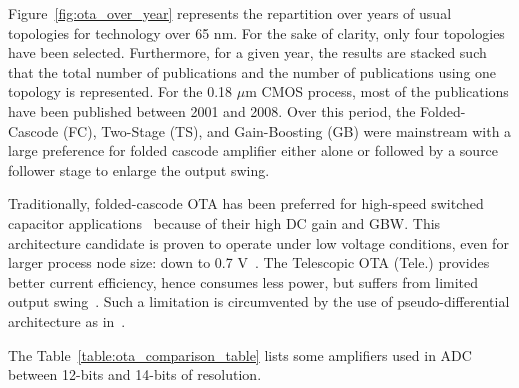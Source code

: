 Figure~\ref{fig:ota_over_year} represents the repartition over years of usual topologies for technology over 65 nm. For the sake of clarity, only four topologies have been selected. Furthermore, for a given year, the results are stacked such that the total number of publications and the number of publications using one topology is represented.
For the 0.18 \(\mu \)m CMOS process, most of the publications have been published between 2001 and 2008. Over this period, the Folded-Cascode (FC), Two-Stage (TS), and Gain-Boosting (GB) were mainstream with a large preference for folded cascode amplifier either alone or followed by a source follower stage to enlarge the output swing.

Traditionally, folded-cascode OTA has been preferred for high-speed switched capacitor applications~\cite{Olivera1999, Adut2003} because of their high DC gain and GBW\@. This architecture candidate is proven to operate under low voltage conditions, even for larger process node size: down to 0.7 V~\cite{Sauerbrey2002, Ahn2005}.
The Telescopic OTA (Tele.) provides better current efficiency, hence consumes less power, but suffers from limited output swing~\cite{Quinn2000}. Such a limitation is circumvented by the use of pseudo-differential architecture as in~\cite{Chiu2004}.

The Table~\ref{table:ota_comparison_table} lists some amplifiers used in ADC between 12-bits and 14-bits of resolution. 

